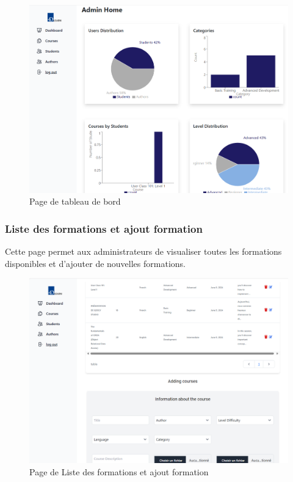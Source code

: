 \begin{figure}[H]
    \centering
    \includegraphics[width=19cm]{Figures/dashboard.png}
    \caption{ Page de tableau de bord}
\end{figure}

\subsubsection{Liste des formations et ajout formation}

Cette page permet aux administrateurs de visualiser toutes les formations disponibles et d'ajouter de nouvelles formations.

\begin{figure}[H]
    \centering
    \includegraphics[width=19cm]{Figures/addCourse.png}
    \caption{ Page de Liste des formations et ajout formation}
\end{figure}

